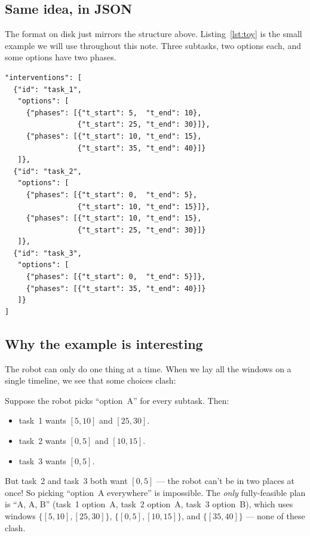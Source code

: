 \documentclass[11pt]{article}
\begin{document}
\subsection{Same idea, in JSON}

The format on disk just mirrors the structure above.
Listing~\ref{lst:toy} is the small example we will use throughout
this note. Three subtasks, two options each, and some options have
two phases.

\begin{lstlisting}[caption={Our toy ground truth: three subtasks, two options each. Notice how some windows are reused across different options on purpose.},label=lst:toy]
"interventions": [
  {"id": "task_1",
   "options": [
     {"phases": [{"t_start": 5,  "t_end": 10},
                 {"t_start": 25, "t_end": 30}]},
     {"phases": [{"t_start": 10, "t_end": 15},
                 {"t_start": 35, "t_end": 40}]}
   ]},
  {"id": "task_2",
   "options": [
     {"phases": [{"t_start": 0,  "t_end": 5},
                 {"t_start": 10, "t_end": 15}]},
     {"phases": [{"t_start": 10, "t_end": 15},
                 {"t_start": 25, "t_end": 30}]}
   ]},
  {"id": "task_3",
   "options": [
     {"phases": [{"t_start": 0,  "t_end": 5}]},
     {"phases": [{"t_start": 35, "t_end": 40}]}
   ]}
]
\end{lstlisting}

\subsection{Why the example is interesting}

The robot can only do one thing at a time. When we lay all the windows
on a single timeline, we see that some choices clash:

\begin{example}
Suppose the robot picks ``option~A'' for every subtask. Then:
\begin{itemize}
  \item task~1 wants $[5,10]$ and $[25,30]$.
  \item task~2 wants $[0,5]$ and $[10,15]$.
  \item task~3 wants $[0,5]$.
\end{itemize}
But task~2 and task~3 both want $[0,5]$ --- the robot can't be in two
places at once! So picking ``option~A everywhere'' is impossible. The
\emph{only} fully-feasible plan is ``A, A, B'' (task~1 option~A, task~2
option~A, task~3 option~B), which uses windows
$\{[5,10], [25,30]\}$, $\{[0,5], [10,15]\}$, and $\{[35,40]\}$ ---
none of these clash.
\end{example}
\end{document}
